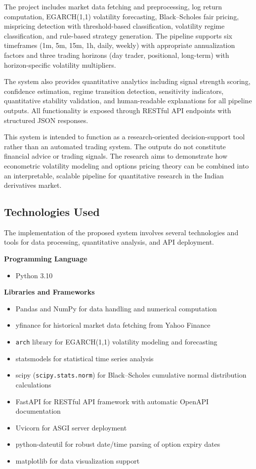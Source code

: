 \documentclass[12pt,a4paper]{article}
\begin{document}
The project includes market data fetching and preprocessing, log return computation, EGARCH(1,1) volatility forecasting, Black--Scholes fair pricing, mispricing detection with threshold-based classification, volatility regime classification, and rule-based strategy generation. The pipeline supports six timeframes (1m, 5m, 15m, 1h, daily, weekly) with appropriate annualization factors and three trading horizons (day trader, positional, long-term) with horizon-specific volatility multipliers.

The system also provides quantitative analytics including signal strength scoring, confidence estimation, regime transition detection, sensitivity indicators, quantitative stability validation, and human-readable explanations for all pipeline outputs. All functionality is exposed through RESTful API endpoints with structured JSON responses.

This system is intended to function as a research-oriented decision-support tool rather than an automated trading system. The outputs do not constitute financial advice or trading signals. The research aims to demonstrate how econometric volatility modeling and options pricing theory can be combined into an interpretable, scalable pipeline for quantitative research in the Indian derivatives market.

\subsection{Technologies Used}

The implementation of the proposed system involves several technologies and tools for data processing, quantitative analysis, and API deployment.

\textbf{Programming Language}

\begin{itemize}
    \item Python 3.10
\end{itemize}

\textbf{Libraries and Frameworks}

\begin{itemize}
    \item Pandas and NumPy for data handling and numerical computation
    \item yfinance for historical market data fetching from Yahoo Finance
    \item \texttt{arch} library for EGARCH(1,1) volatility modeling and forecasting
    \item statsmodels for statistical time series analysis
    \item scipy (\texttt{scipy.stats.norm}) for Black--Scholes cumulative normal distribution calculations
    \item FastAPI for RESTful API framework with automatic OpenAPI documentation
    \item Uvicorn for ASGI server deployment
    \item python-dateutil for robust date/time parsing of option expiry dates
    \item matplotlib for data visualization support
\end{itemize}
\end{document}
